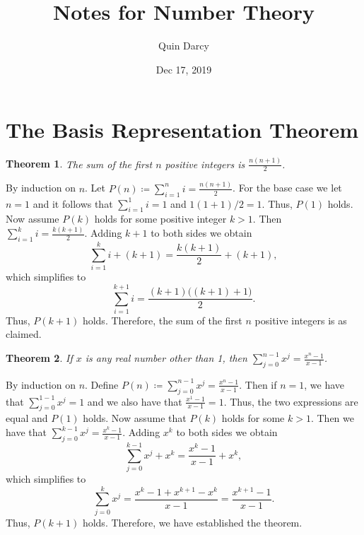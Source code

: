 \documentclass{article}
\makeatletter
\newtheorem{theorem}{\hspace{6.5mm}Theorem}[section]
\theoremstyle{definition}
\theoremstyle{remark}
\let\oldproofname=\proofname
\renewcommand{\proofname}{\bf{\textit{\oldproofname}}}
\theoremstyle{definition}
\renewenvironment{proof}[1][\proofname]{\par
  \pushQED{\qed}%
  \normalfont \topsep6\p@\@plus6\p@\relax
  \list{}{\leftmargin=0mm
          \rightmargin=0mm
          \settowidth{\itemindent}{\itshape#1}%
          \labelwidth=4mm
          \parsep=0pt \listparindent=0mm%
  }
  \item[\hskip\labelsep
        \itshape
    #1\@addpunct{.}]\ignorespaces
}{%
  \popQED\endlist\@endpefalse
}
\makeatother
\begin{document}
\title{Notes for Number Theory}
\author{Quin Darcy}
\date{Dec 17, 2019}
\maketitle

\section{The Basis Representation Theorem}

\begin{theorem}\label{thm:1.1}
    The sum of the first $n$ positive integers is $\frac{n(n+1)}{2}$.
\end{theorem}

\begin{proof}
    By induction on $n$. Let $P(n)\coloneqq\sum\limits_{i=1}^n i=\frac{n(n+1)}{2}$. For the base case we let $n=1$ and it follows that $\sum\limits_{i=1}^1 i=1$ and $1(1+1)/2=1$. Thus, $P(1)$ holds. Now assume $P(k)$ holds for some positive integer $k>1$. Then $\sum\limits_{i=1}^k i=\frac{k(k+1)}{2}$. Adding $k+1$ to both sides we obtain
        \begin{equation*}
            \sum\limits_{i=1}^k i+(k+1)=\frac{k(k+1)}{2}+(k+1),
        \end{equation*}
    \noindent which simplifies to
        \begin{equation*}
            \sum\limits_{i=1}^{k+1}i=\frac{(k+1)\big((k+1)+1\big)}{2}.
        \end{equation*}
    \noindent Thus, $P(k+1)$ holds. Therefore, the sum of the first $n$ positive integers is as claimed.
\end{proof}

\begin{theorem}\label{thm:1.2}
    If $x$ is any real number other than 1, then $\sum\limits_{j=0}^{n-1} x^j=\frac{x^n-1}{x-1}$. 
\end{theorem}
    \begin{proof}
        By induction on $n$. Define $P(n)\coloneqq\sum\limits_{j=0}^{n-1}x^j=\frac{x^n-1}{x-1}$. Then if $n=1$, we have that $\sum\limits_{j=0}^{1-1}x^j=1$ and we also have that $\frac{x^1-1}{x-1}=1$. Thus, the two expressions are equal and $P(1)$ holds. Now assume that $P(k)$ holds for some $k>1$. Then we have that $\sum\limits_{j=0}^{k-1}x^j=\frac{x^k-1}{x-1}$. Adding $x^k$ to both sides we obtain
            \begin{equation*}
                \sum\limits_{j=0}^{k-1}x^j+x^k=\frac{x^k-1}{x-1}+x^k,
            \end{equation*}
        \noindent which simplifies to 
            \begin{equation*}
                \sum\limits_{j=0}^k x^j=\frac{x^k-1+x^{k+1}-x^k}{x-1}=\frac{x^{k+1}-1}{x-1}.
            \end{equation*}
        \noindent Thus, $P(k+1)$ holds. Therefore, we have established the theorem.
    \end{proof}
    
\end{document}
